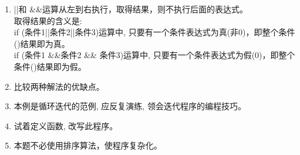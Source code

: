 \begin{note}[要点]
	\begin{enumerate}
		\item ||和 \&\&运算从左到右执行，取得结果，则不执行后面的表达式。\\
		取得结果的含义是: \\
		if (条件1||条件2||条件3)运算中, 只要有一个条件表达式为真(非0)，即整个条件()结果即为真。 \\
		if (条件1 \&\&条件2 \&\& 条件3)运算中, 只要有一个条件表达式为假(0)，即整个条件()结果即为假。
		\item 比较两种解法的优缺点。
		\item 本例是循环迭代的范例, 应反复演练, 领会迭代程序的编程技巧。
		\item 试着定义函数, 改写此程序。
		\item 本题不必使用排序算法，使程序复杂化。
	\end{enumerate}	
\end{note}



